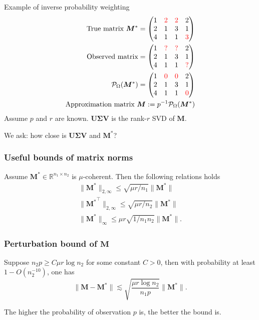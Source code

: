 \documentclass[override]{beamer} %
\theoremstyle{remark}
\newcommand{\bs}[1]{{\boldsymbol{#1}^*}}
\newcommand{\bb}[1]{{\boldsymbol {#1}}}
\def\red{\textcolor{red}}
\begin{document}
\begin{frame}{Example of inverse probability weighting}
\begin{align*}
     \text{True matrix } 
     \bs M
    =
    \begin{pmatrix}
    1 & \red{2} & \red{2} & 2 \\
    2& 1 & 3& 1\\
    4 & 1& 1& \red{3}
    \end{pmatrix}\\
    \text{Observed matrix}
    =
    \begin{pmatrix}
    1 & \red{?} & \red{?} & 2 \\
    2& 1 & 3& 1\\
    4 & 1& 1& \red{?}
    \end{pmatrix}
    \\
     \mathcal P_\Omega(\bs M)
    =
    \begin{pmatrix}
    1 & \red{0} & \red{0} & 2 \\
    2& 1 & 3& 1\\
    4 & 1& 1& \red{0}
    \end{pmatrix}\\
    \text{Approximation matrix } 
    \bb{M}:= p^{-1} \mathcal P_\Omega (\bs {M}) 
\end{align*}
Assume $p$ and $r$ are known. $\bb U\bb\Sigma \bb V$ is the rank-$r$ SVD of $\mathbf M$.

We ask: how close is $\bb U\bb\Sigma \bb V$ and $\bs M$?
\end{frame}


\begin{frame}
\frametitle{Useful bounds of matrix norms}
\begin{lemma}
\label{LEM1}
Assume $\bs M \in \mathbb{R}^{n_1\times n_2}$ is $\mu$-coherent. Then the following relations holds
\begin{align}
    \|\bs M\|_{2,\infty} \leq \sqrt{\mu r/n_1}\|\bs M\|\\
     \|\bs M^\top\|_{2,\infty} \leq \sqrt{\mu r/n_2}\|\bs M\|\\
      \|\bs M\|_{\infty} \leq \mu r\sqrt{1/n_1n_2}\|\bs M\|.
\end{align}
\end{lemma}

\end{frame}



\begin{frame}
\frametitle{Perturbation bound of $\bb M$}
\begin{lemma}
\label{LEM2}
Suppose $n_2 p\geq C\mu r\log n_2$ for some constant $C>0$, then with probability at least $1-O(n_2^{-10})$, one has 
\[
\|\bb M -\bs M\| 
\lesssim
\sqrt{\frac{\mu r\log n_2}{n_1 p}} \|\bs M\|.
\]
\end{lemma}
The higher the probability of observation $p$ is, the better the bound is.
\end{frame}
\end{document}
